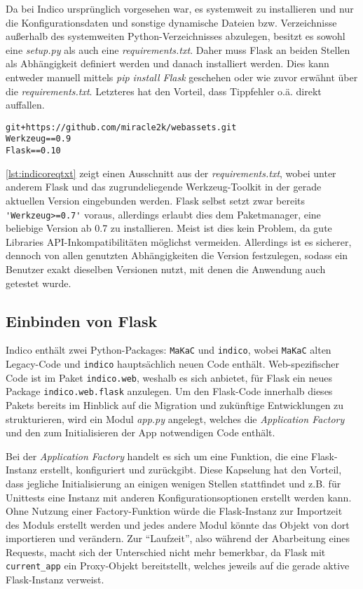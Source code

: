 Da bei Indico ursprünglich vorgesehen war, es systemweit zu installieren und nur die
Konfigurationsdaten und sonstige dynamische Dateien bzw. Verzeichnisse außerhalb des systemweiten
Python-Verzeichnisses abzulegen, besitzt es sowohl eine \emph{setup.py} als auch eine
\emph{requirements.txt}. Daher muss Flask an beiden Stellen als Abhängigkeit definiert werden und
danach installiert werden. Dies kann entweder manuell mittels \emph{pip install Flask} geschehen
oder wie zuvor erwähnt über die \emph{requirements.txt}. Letzteres hat den Vorteil, dass Tippfehler
o.ä. direkt auffallen.

\begin{lstlisting}[caption=Auszug aus der requirements.txt von Indico,label=lst:indicoreqtxt]
git+https://github.com/miracle2k/webassets.git
Werkzeug==0.9
Flask==0.10
\end{lstlisting}

\autoref{lst:indicoreqtxt} zeigt einen Ausschnitt aus der \emph{requirements.txt}, wobei unter
anderem Flask und das zugrundeliegende Werkzeug-Toolkit in der gerade aktuellen Version eingebunden
werden. Flask selbst setzt zwar bereits \lstinline{'Werkzeug>=0.7'} voraus, allerdings erlaubt dies
dem Paketmanager, eine beliebige Version ab 0.7 zu installieren. Meist ist dies kein Problem, da
gute Libraries API-Inkompatibilitäten möglichst vermeiden. Allerdings ist es sicherer, dennoch von
allen genutzten Abhängigkeiten die Version festzulegen, sodass ein Benutzer exakt dieselben
Versionen nutzt, mit denen die Anwendung auch getestet wurde.


\subsection{Einbinden von Flask}

Indico enthält zwei Python-Packages: \lstinline{MaKaC} und \lstinline{indico}, wobei
\lstinline{MaKaC} alten Legacy-Code und \lstinline{indico} hauptsächlich neuen Code enthält.
Web-spezifischer Code ist im Paket \lstinline{indico.web}, weshalb es sich anbietet, für Flask ein
neues Package \lstinline{indico.web.flask} anzulegen. Um den Flask-Code innerhalb dieses Pakets
bereits im Hinblick auf die Migration und zukünftige Entwicklungen zu strukturieren, wird ein Modul
\emph{app.py} angelegt, welches die \emph{Application Factory} und den zum Initialisieren der App
notwendigen Code enthält.

Bei der \emph{Application Factory} handelt es sich um eine Funktion, die eine Flask-Instanz
erstellt, konfiguriert und zurückgibt. Diese Kapselung hat den Vorteil, dass jegliche Initialisierung an
einigen wenigen Stellen stattfindet und z.B. für Unittests eine Instanz mit anderen
Konfigurationsoptionen erstellt werden kann. Ohne Nutzung einer Factory-Funktion würde die
Flask-Instanz zur Importzeit des Moduls erstellt werden und jedes andere Modul könnte das Objekt von
dort importieren und verändern. Zur \enquote{Laufzeit}, also während der Abarbeitung eines Requests,
macht sich der Unterschied nicht mehr bemerkbar, da Flask mit \lstinline{current_app} ein
Proxy-Objekt bereitstellt, welches jeweils auf die gerade aktive Flask-Instanz verweist.

